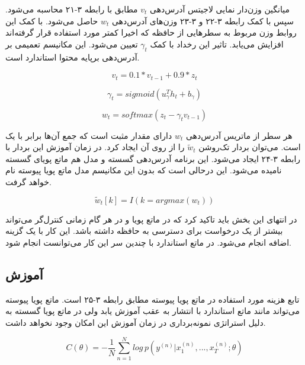 میانگین وزن‌دار نمایی لاجیتس آدرس‌دهی $v_t$ مطابق با رابطه ۳-۲۱ محاسبه می‌شود. سپس با کمک رابطه ۳-۲۲ و ۳-۲۳ وزن‌های آدرس‌دهی $w_t$ حاصل می‌شود. با کمک این روابط وزن مربوط به سطرهایی از حافظه که اخیرا کمتر مورد استفاده قرار گرفته‌اند افزایش می‌یابد. تاثیر این رخداد با کمک $\gamma_t$ تعیین می‌شود. این مکانیسم تعمیمی بر آدرس‌دهی برپایه محتوا استاندارد است.\cite{gulcehre2018dynamic}

\begin{equation}
v_t = 0.1 * v_{t-1} + 0.9 * z_t
\end{equation}

\begin{equation}
\gamma_t = sigmoid(u_\gamma^Th_t + b_\gamma)
\end{equation}

\begin{equation}
w_t = softmax(z_t - \gamma_tv_{t-1})
\end{equation}

هر سطر از ماتریس آدرس‌دهی $w_t$ دارای مقدار مثبت است که جمع آن‌ها برابر با یک است. می‌توان بردار تک‌روشن $\tilde{w}_t$ را از روی آن ایجاد کرد. در زمان آموزش این بردار با رابطه ۳-۲۴ ایجاد می‌شود. این برنامه آدرس‌دهی گسسته و مدل هم ماتع پویای گسسته نامیده می‌شود. این درحالی است که بدون این مکانیسم مدل ماتع پویا پیوسته نام خواهد گرفت.\cite{gulcehre2018dynamic}

\begin{equation}
\tilde{w}_t[k] = I(k=argmax(w_t))
\end{equation}

در انتهای این بخش باید تاکید کرد که در ماتع پویا و در هر گام زمانی کنترل‌گر می‌تواند بیشتر از یک درخواست برای دسترسی به حافظه داشته باشد. این کار با یک گزینه اضافه انجام می‌شود. در ماتع استاندارد با چندین سر این کار می‌توانست انجام شود.\cite{gulcehre2018dynamic}

\subsection{آموزش}

تابع هزینه مورد استفاده در ماتع پویا پیوسته مطابق رابطه ۳-۲۵ است. ماتع پویا پیوسته می‌تواند مانند ماتع استاندارد با انتشار به عقب  آموزش یابد ولی در ماتع پویا گسسته به دلیل استراتژی نمونه‌برداری در زمان آموزش این امکان وجود نخواهد داشت.\cite{gulcehre2018dynamic}

\begin{equation}
C(\theta) = - \frac{1}{N} \sum_{n=1}^N log\, p(y^{(n)}|x_1^{(n)},...,x_T^{(n)}; \theta)
\end{equation}

